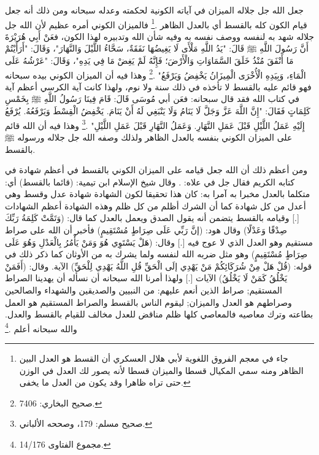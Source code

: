 جعل الله جل جلاله الميزان في آياته الكونية لحكمته وعدله سبحانه ومن ذلك أنه جعل قيام الكون كله بالقسط أي بالعدل الظاهر \href{https://shamela.ws/book/1736/428#p5}{\faExternalLink} \cite{askaari_Furuq}.\footnote{جاء في معجم الفروق اللغوية لأبي هلال العسكري  أن القسط هو العدل البين الظاهر ومنه سمي المكيال قسطا والميزان قسطا لأنه يصور لك العدل في الوزن حتى تراه ظاهرا وقد يكون من العدل ما يخفى.} فالميزان الكوني أمره عظيم لأن الله جل جلاله شهد به لنفسه ووصف نفسه به وفيه شأن الله وتدبيره لهذا الكون، فعَنْ أَبِي هُرَيْرَةَ أَنَّ رَسُولَ اللَّهِ ﷺ قَالَ: "يَدُ اللَّهِ مَلْأَى لَا يَغِيضُهَا نَفَقَةٌ، سَحَّاءُ اللَّيْلَ وَالنَّهَارَ"، وَقَالَ: "أَرَأَيْتُمْ مَا أَنْفَقَ مُنْذُ خَلَقَ السَّمَاوَاتِ وَالْأَرْضَ؛ فَإِنَّهُ لَمْ يَغِضْ مَا فِي يَدِهِ"، وَقَالَ: "عَرْشُهُ عَلَى الْمَاءِ، وَبِيَدِهِ الْأُخْرَى الْمِيزَانُ يَخْفِضُ وَيَرْفَعُ" \href{https://shamela.ws/book/1284/4620#p2}{\faExternalLink} \cite{bukhari}.\footnote{صحيح البخاري: 7406.} وهذا فيه أن الميزان الكوني بيده سبحانه فهو قائم عليه بالقسط لا تأخذه في ذلك سنة ولا نوم، ولهذا كانت آية الكرسي أعظم آية في كتاب الله فقد قال سبحانه:
\quranayah*[2][255][1-12] {\footnotesize (\surahname*[2])} فعَن أبي مُوسَى قَالَ: قَامَ فِينَا رَسُولُ اللَّهِ ﷺ بِخَمْسِ كَلِمَاتٍ فَقَالَ:  "إِنَّ اللَّهَ عَزَّ وَجَلَّ لَا يَنَامُ وَلَا يَنْبَغِي لَهُ أَنْ يَنَامَ. يَخْفِضُ الْقِسْطَ وَيَرْفَعُهُ. يُرْفَعُ إِلَيْهِ عَمَلُ اللَّيْلِ قَبْلَ عَمَلِ النَّهَارِ. وَعَمَلُ النَّهَارِ قَبْلَ عَمَلِ اللَّيْلِ" \href{https://shamela.ws/book/1727/393#p5}{\faExternalLink} \cite{muslim}.\footnote{صحيح مسلم: 179، وصححه الألباني.} وهذا فيه أن الله قائم على الميزان الكوني بنفسه بالعدل الظاهر ولذلك وصفه الله جل جلاله ورسوله ﷺ بالقسط.

ومن أعظم ذلك أن الله جعل قيامه على الميزان الكوني بالقسط في أعظم شهادة في كتابه الكريم فقال جل في علاه: \quranayah*[3][18]{\footnotesize \surahname*[3]}. وقال شيخ الإسلام ابن تيمية: (قائما بالقسط) أي: متكلما بالعدل مخبرا به آمرا به: كان هذا تحقيقا لكون الشهادة شهادة عدل وقسط وهي أعدل من كل شهادة كما أن الشرك أظلم من كل ظلم وهذه الشهادة أعظم الشهادات [.] وقيامه بالقسط يتضمن أنه يقول الصدق ويعمل بالعدل كما قال: (وَتَمَّتْ كَلِمَةُ رَبِّكَ صِدْقًا وَعَدْلًا) وقال هود: (إنَّ رَبِّي عَلَى صِرَاطٍ مُسْتَقِيمٍ) فأخبر أن الله على صراط مستقيم وهو العدل الذي لا عوج فيه [.] وقال: (هَلْ يَسْتَوِي هُوَ وَمَنْ يَأْمُرُ بِالْعَدْلِ وَهُوَ عَلَى صِرَاطٍ مُسْتَقِيمٍ) وهو مثل ضربه الله لنفسه ولما يشرك به من الأوثان كما ذكر ذلك في قوله: (قُلْ هَلْ مِنْ شُرَكَائِكُمْ مَنْ يَهْدِي إلَى الْحَقِّ قُلِ اللَّهُ يَهْدِي لِلْحَقِّ) الآية. وقال: (أَفَمَنْ يَخْلُقُ كَمَنْ لَا يَخْلُقُ) الآيات  [.] ولهذا أمرنا الله سبحانه أن نسأله أن يهدينا الصراط المستقيم; صراط الذين أنعم عليهم: من النبيين والصديقين والشهداء والصالحين وصراطهم هو العدل والميزان; ليقوم الناس بالقسط والصراط المستقيم هو العمل بطاعته وترك معاصيه فالمعاصي كلها ظلم مناقض للعدل مخالف للقيام بالقسط والعدل. والله سبحانه أعلم \href{https://shamela.ws/book/7289/7239#p1}{\faExternalLink} \cite{ibnTaimia_Majmoo}.\footnote{مجموع الفتاوى 14/176.}

